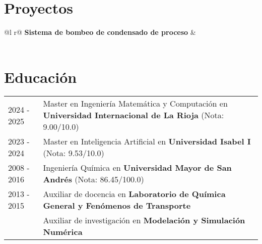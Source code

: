 \documentclass[a4paper,12pt]{article}
\begin{document}
\section{Proyectos}

\begin{tabularx}{\linewidth}{ @{}l r@{} }
\textbf{Sistema de bombeo de condensado de proceso} & \hfill  \\[3.75pt]
  \\
\end{tabularx}

\section{Educación}
\begin{tabularx}{\linewidth}{@{}l X@{}}	
2024 - 2025 & Master en Ingeniería Matemática y Computación en \textbf{Universidad Internacional de La Rioja} \hfill (Nota: 9.00/10.0)\normalsize  \\

2023 - 2024 & Master en Inteligencia Artificial en \textbf{Universidad Isabel I} \hfill (Nota: 9.53/10.0) \\ 

2008 - 2016 & Ingeniería Química en \textbf{Universidad Mayor de San Andrés} \hfill (Nota: 86.45/100.0) \\ 
2013 - 2015 & Auxiliar de docencia en \textbf{Laboratorio de Química General y Fenómenos de Transporte}  \\
& Auxiliar de investigación en \textbf{Modelación y Simulación Numérica}  \\

\end{tabularx}
\end{document}
